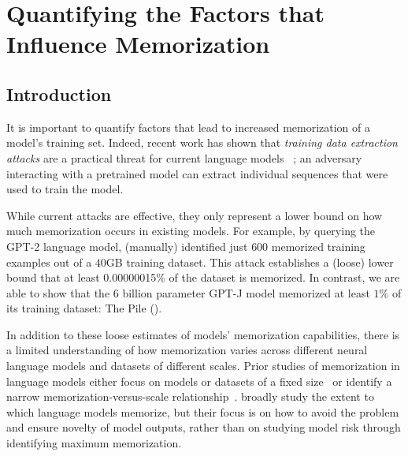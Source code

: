 \section{Quantifying the Factors that Influence Memorization}
\label{section:quantifying_memorization}

\subsection{Introduction}

It is important to  quantify factors that lead to increased memorization of a model's training set.
%
Indeed, recent work has shown that \emph{training data extraction attacks} are a practical threat for current language models ~\citep{carlini2020extracting};
an adversary interacting with a pretrained model can extract individual
sequences that were used to train the model.

While current attacks are effective, they only represent a lower bound on how much memorization occurs in existing models.
%
For example, by querying
the GPT-2 language model, \citet{carlini2020extracting} (manually) identified just $600$ memorized training examples out of a $40$GB training dataset.
%
This attack establishes a (loose) lower bound that at least
0.00000015\%
of the dataset is memorized. %
% 
In contrast, we are able to show that the 6 billion parameter 
GPT-J model \citep{gpt-neo,gpt-j} memorized at least $1\%$ of its training dataset: The Pile (\cite{gao2020pile}).

In addition to these loose estimates of models' memorization capabilities, there is a limited understanding of how memorization varies across different neural language models and datasets of different scales.
%
Prior studies of memorization in language models either focus on models or datasets of a fixed size~\citep{carlini2019secret, zhang2021counterfactual, thakkar2020understanding} or identify a narrow memorization-versus-scale relationship~\citep{carlini2020extracting, 2021dedup}.
\citet{mccoy2021raven} broadly study the extent to which language models memorize, but their focus is on how to avoid the problem and ensure novelty of model outputs, rather than on studying model risk through identifying maximum memorization.

